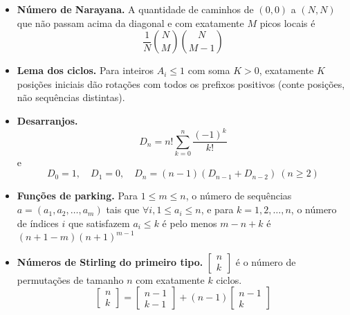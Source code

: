 \begin{itemize}[leftmargin=*,label={}]
	\item \textbf{Número de Narayana.}
		A quantidade de caminhos de $(0, 0)$ a $(N, N)$ que não passam acima da diagonal e com exatamente $M$ picos locais é
		\[
			\frac1N\binom{N}{M}\binom{N}{M - 1}
		\]

	\item \textbf{Lema dos ciclos.}
		Para inteiros $A_i\le1$ com soma $K>0$, exatamente $K$ posições iniciais dão rotações com todos os prefixos positivos (conte posições, não sequências distintas).

	\item \textbf{Desarranjos.}
		\[
			D_n = n!\sum_{k=0}^{n}\frac{(-1)^k}{k!}
		\]
		e
		\[
			D_0=1,\quad D_1=0,\quad D_n=(n-1)(D_{n-1}+D_{n-2})\ (n\ge2)
		\]

	\item \textbf{Funções de parking.}
		Para $1\le m\le n$, o número de sequências $a = (a_1, a_2, \dots, a_m)$ tais que $\forall i, 1 \le a_i \le n$, e para $k = 1, 2, \dots, n$, o número de índices $i$ que satisfazem $a_i \le k$ é pelo menos $m - n + k$ é $(n + 1 - m)(n + 1)^{m - 1}$

	\item \textbf{Números de Stirling do primeiro tipo.}
		$\begin{bmatrix} n \\ k \end{bmatrix}$ é o número de permutações de tamanho $n$ com exatamente $k$ ciclos.
		\[
			\begin{bmatrix} n \\ k \end{bmatrix} = \begin{bmatrix}n-1 \\ k-1 \end{bmatrix} + (n-1) \begin{bmatrix} n-1 \\ k \end{bmatrix}
		\]


\end{itemize}
